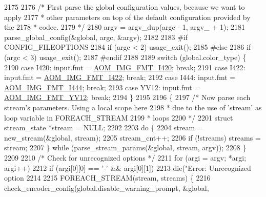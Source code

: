 \begin{DoxyCodeInclude}
{{{{{{{{{{{{{{{{{{{{{{{{{{{{{{{{{{{{{{{{{{{{{{{{{{{2175 
2176   \textcolor{comment}{/* First parse the global configuration values, because we want to apply}
2177 \textcolor{comment}{   * other parameters on top of the default configuration provided by the}
2178 \textcolor{comment}{   * codec.}
2179 \textcolor{comment}{   */}
2180   argv = argv\_dup(argc - 1, argv\_ + 1);
2181   parse\_global\_config(&global, argc, &argv);
2182 
2183 \textcolor{preprocessor}{#if CONFIG\_FILEOPTIONS}
2184   \textcolor{keywordflow}{if} (argc < 2) usage\_exit();
2185 \textcolor{preprocessor}{#else}
2186   \textcolor{keywordflow}{if} (argc < 3) usage\_exit();
2187 \textcolor{preprocessor}{#endif}
2188 
2189   \textcolor{keywordflow}{switch} (global.color\_type) \{
2190     \textcolor{keywordflow}{case} I420: input.fmt = \hyperlink{aom__image_8h_a930317c04b4bd0a660bb5e744055523cabd778a3d697463e89d12a1117f417b60}{AOM\_IMG\_FMT\_I420}; \textcolor{keywordflow}{break};
2191     \textcolor{keywordflow}{case} I422: input.fmt = \hyperlink{aom__image_8h_a930317c04b4bd0a660bb5e744055523cab2f75281e94ebc0f0bc728ef287cd3e8}{AOM\_IMG\_FMT\_I422}; \textcolor{keywordflow}{break};
2192     \textcolor{keywordflow}{case} I444: input.fmt = \hyperlink{aom__image_8h_a930317c04b4bd0a660bb5e744055523ca89d423506e948ab7d3b98b5750b92655}{AOM\_IMG\_FMT\_I444}; \textcolor{keywordflow}{break};
2193     \textcolor{keywordflow}{case} YV12: input.fmt = \hyperlink{aom__image_8h_a930317c04b4bd0a660bb5e744055523cad28244100a2754409f285b77a3db90a0}{AOM\_IMG\_FMT\_YV12}; \textcolor{keywordflow}{break};
2194   \}
2195 
2196   \{
2197     \textcolor{comment}{/* Now parse each stream's parameters. Using a local scope here}
2198 \textcolor{comment}{     * due to the use of 'stream' as loop variable in FOREACH\_STREAM}
2199 \textcolor{comment}{     * loops}
2200 \textcolor{comment}{     */}
2201     \textcolor{keyword}{struct }stream\_state *stream = NULL;
2202 
2203     \textcolor{keywordflow}{do} \{
2204       stream = new\_stream(&global, stream);
2205       stream\_cnt++;
2206       \textcolor{keywordflow}{if} (!streams) streams = stream;
2207     \} \textcolor{keywordflow}{while} (parse\_stream\_params(&global, stream, argv));
2208   \}
2209 
2210   \textcolor{comment}{/* Check for unrecognized options */}
2211   \textcolor{keywordflow}{for} (argi = argv; *argi; argi++)
2212     \textcolor{keywordflow}{if} (argi[0][0] == \textcolor{charliteral}{'-'} && argi[0][1])
2213       die(\textcolor{stringliteral}{"Error: Unrecognized option %
2214 
2215   FOREACH\_STREAM(stream, streams) \{
2216     check\_encoder\_config(global.disable\_warning\_prompt, &global,
}}}}}}}}}}}}}}}}}}}}}}}}}}}}}}}}}}}}}}}}}}}}}}}}}}}}
\end{DoxyCodeInclude}
